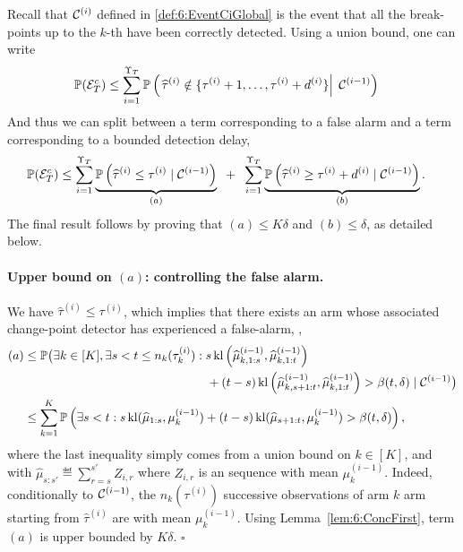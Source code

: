 Recall that $\mathcal{C}^{(i)}$ defined in \eqref{def:6:EventCiGlobal} is the event that all the break-points up to the $k$-th have been correctly detected.
Using a union bound, one can write
%
\begin{align*}
    \mathbb{P}(\mathcal{E}_T^c) & \leq \sum\limits_{i=1}^{\Upsilon_T}
    \mathbb{P}\left(\left. \widehat{\tau}^{(i)} \notin \{ \tau^{(i)}+1, \dots, \tau^{(i)} + d^{(i)} \} \right|\; \mathcal{C}^{(i-1)}\right)
\end{align*}
And thus we can split between a term corresponding to a false alarm and a term corresponding to a bounded detection delay,
\begin{align*}
    \mathbb{P}(\mathcal{E}_T^c) & \leq \sum\limits_{i=1}^{\Upsilon_T} \underbrace{\mathbb{P}\left(\widehat{\tau}^{(i)} \leq \tau^{(i)} \;|\; \mathcal{C}^{(i-1)}\right)}_{(a)} \;\; + \;\; \sum\limits_{i=1}^{\Upsilon_T} \underbrace{\mathbb{P}\left(\widehat{\tau}^{(i)} \geq \tau^{(i)} + d^{(i)} \;|\; \mathcal{C}^{(i-1)}\right)}_{(b)}.
\end{align*}
%
The final result follows by proving that $(a) \leq K \delta$ and $(b)\leq \delta$, as detailed below.


\paragraph{Upper bound on $(a)$: controlling the false alarm.}
%
We have $\widehat{\tau}^{(i)} \leq \tau^{(i)}$, which implies that there exists an arm whose associated change-point detector has experienced a false-alarm, \ie,
%
\begin{align*}
    (a) & \leq \bP\bigl(\exists k\in[K], \exists s < t \leq n_k(\tau_k^{(i)})
        : s \, \kl\left(\widehat{\mu}_{k,1:s}^{(i-1)},\widehat{\mu}_{k,1:t}^{(i-1)}\right) \\
    & \hspace*{150pt} + (t - s) \, \kl\left(\widehat{\mu}_{k,s+1:t}^{(i-1)},\widehat{\mu}_{k,1:t}^{(i-1)}\right) > \beta(t, \delta) \;|\; \cC^{(i-1)}\bigr) \\
    & \leq \sum_{k=1}^K\bP\left(\exists s < t : s \, \kl(\widehat{\mu}_{1:s},\mu_k^{(i-1)}) + (t - s) \, \kl(\widehat{\mu}_{s+1:t}, \mu_k^{(i-1)}) > \beta(t, \delta)\right),
\end{align*}
where the last inequality simply comes from a union bound on $k\in[K]$,
and with $\widehat{\mu}_{s:s'} \eqdef \sum_{r=s}^{s'} Z_{i,r}$ where $Z_{i,r}$ is an \iid{} sequence with mean $\mu_k^{(i-1)}$.
Indeed, conditionally to $\mathcal{C}^{(i-1)}$, the $n_k(\tau^{(i)})$ successive observations of arm $k$ arm starting from $\widehat{\tau}^{(i)}$ are \iid{} with mean $\mu_k^{(i-1)}$.
Using Lemma~\ref{lem:6:ConcFirst}, term $(a)$ is upper bounded by $K\delta$.
%
\hfill{}$\square$

